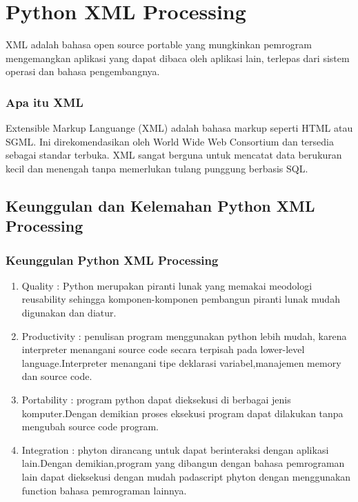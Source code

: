 
\section{Python XML Processing}
  XML adalah bahasa open source portable yang mungkinkan pemrogram mengemangkan aplikasi yang dapat dibaca oleh aplikasi lain, 
terlepas dari sistem operasi dan bahasa pengembangnya.
\subsubsection{Apa itu XML}
  Extensible Markup Languange (XML) adalah bahasa markup seperti HTML atau SGML. 
Ini direkomendasikan oleh World Wide Web Consortium dan tersedia sebagai standar terbuka.
XML sangat berguna untuk mencatat data berukuran kecil dan menengah tanpa memerlukan tulang punggung berbasis SQL. 

\subsection{Keunggulan dan Kelemahan Python XML Processing}
\subsubsection{Keunggulan Python XML Processing}
\begin{enumerate}
Keunggulan dari python dapat dijabarkan dari faktor-faktor berikut ini :
\item Quality : Python merupakan piranti lunak yang memakai meodologi reusability sehingga komponen-komponen pembangun piranti      lunak mudah digunakan dan diatur.
\item Productivity : penulisan program menggunakan python lebih mudah, karena interpreter menangani source code secara terpisah pada lower-level language.Interpreter menangani tipe deklarasi variabel,manajemen memory dan source code.
\item Portability : program python dapat dieksekusi di berbagai jenis komputer.Dengan demikian proses eksekusi program dapat dilakukan tanpa mengubah source code program.
\item Integration : phyton dirancang untuk dapat berinteraksi dengan aplikasi lain.Dengan demikian,program yang dibangun dengan bahasa pemrograman lain dapat dieksekusi dengan mudah padascript phyton dengan menggunakan function bahasa pemrograman lainnya.
\end{enumerate}




